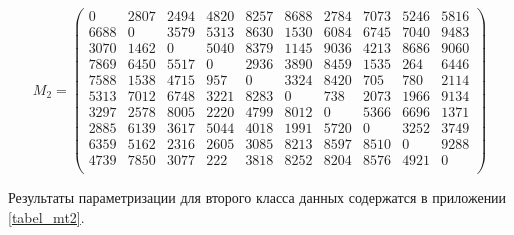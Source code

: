 \begin{equation}
	\label{eq:mt2}
	M_2 = 
	\begin{pmatrix}
		0 & 2807 & 2494 & 4820 & 8257 & 8688 & 2784 & 7073 & 5246 & 5816 \\
		6688 & 0 & 3579 & 5313 & 8630 & 1530 & 6084 & 6745 & 7040 & 9483 \\
		3070 & 1462 & 0 & 5040 & 8379 & 1145 & 9036 & 4213 & 8686 & 9060 \\
		7869 & 6450 & 5517 & 0 & 2936 & 3890 & 8459 & 1535 & 264 & 6446 \\
		7588 & 1538 & 4715 & 957 & 0 & 3324 & 8420 & 705 & 780 & 2114 \\
		5313 & 7012 & 6748 & 3221 & 8283 & 0 & 738 & 2073 & 1966 & 9134 \\
		3297 & 2578 & 8005 & 2220 & 4799 & 8012 & 0 & 5366 & 6696 & 1371 \\
		2885 & 6139 & 3617 & 5044 & 4018 & 1991 & 5720 & 0 & 3252 & 3749 \\
		6359 & 5162 & 2316 & 2605 & 3085 & 8213 & 8597 & 8510 & 0 & 9288 \\
		4739 & 7850 & 3077 & 222 & 3818 & 8252 & 8204 & 8576 & 4921 & 0 \\
	\end{pmatrix}
\end{equation}

Результаты параметризации для второго класса данных содержатся в приложении \ref{tabel_mt2}.